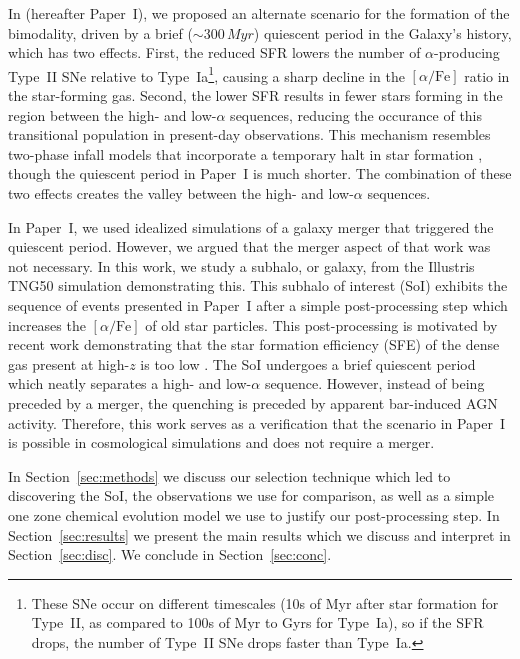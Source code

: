 \documentclass[twocolumn]{aastex631}
\newcommand{\alphaFe}{\ensuremath{[\alpha/\textrm{Fe}]}}
\begin{document}
In \citet{2024arXiv240707985B} (hereafter Paper~I), we proposed an alternate scenario for the formation of the bimodality, driven by a brief ($\sim300\,Myr$) quiescent period in the Galaxy's history, which has two effects. First, the reduced SFR lowers the number of $\alpha$-producing Type~II SNe relative to Type~Ia\footnote{These SNe occur on different timescales (10s of Myr after star formation for Type~II, as compared to 100s of Myr to Gyrs for Type~Ia), so if the SFR drops, the number of Type~II SNe drops faster than Type~Ia.}, causing a sharp decline in the \alphaFe{} ratio in the star-forming gas. Second, the lower SFR results in fewer stars forming in the region between the high- and low-$\alpha$ sequences, reducing the occurance of this transitional population in present-day observations. This mechanism resembles two-phase infall models that incorporate a temporary halt in star formation \citep[][and references therein]{2024arXiv240511025S}, though the quiescent period in Paper~I is much shorter. The combination of these two effects creates the valley between the high- and low-$\alpha$ sequences.

In Paper~I, we used idealized simulations of a galaxy merger that triggered the quiescent period. However, we argued that the merger aspect of that work was not necessary. In this work, we study a subhalo, or galaxy, from the Illustris TNG50 simulation demonstrating this. This subhalo of interest (SoI) exhibits the sequence of events presented in Paper~I after a simple post-processing step which increases the \alphaFe{} of old star particles. This post-processing is motivated by recent work demonstrating that the star formation efficiency (SFE) of the dense gas present at high-$z$ is too low \citep{2024arXiv240909121H}. The SoI undergoes a brief quiescent period which neatly separates a high- and low-$\alpha$ sequence. However, instead of being preceded by a merger, the quenching is preceded by apparent bar-induced AGN activity. Therefore, this work serves as a verification that the scenario in Paper~I is possible in cosmological simulations and does not require a merger.

In Section~\ref{sec:methods} we discuss our selection technique which led to discovering the SoI, the observations we use for comparison, as well as a simple one zone chemical evolution model we use to justify our post-processing step. In Section~\ref{sec:results} we present the main results which we discuss and interpret in Section~\ref{sec:disc}. We conclude in Section~\ref{sec:conc}.
\end{document}
